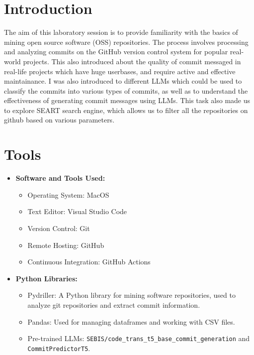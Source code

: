 \documentclass[12pt, a4paper]{report}
\begin{document}
\section{Introduction}

The aim of this laboratory session is to provide familiarity with the basics of mining open source software (OSS) repositories. 
The process involves processing and analyzing commits on the GitHub version control system for popular real-world projects. 
This also introduced about the quality of commit messaged in real-life projects which have huge userbases, and require active and effective maintainance. I was also introduced to different LLMs which could be used to classify the commits into various types of commits, as well as to understand the effectiveness of generating commit messages using LLMs.
This task also made us to explore SEART search engine, which allows us to filter all the repositories on github based on various parameters.

\section{Tools}

\begin{itemize}
    \item \textbf{Software and Tools Used:}
    \begin{itemize}
        \item Operating System: MacOS
        \item Text Editor: Visual Studio Code
        \item Version Control: Git
        \item Remote Hosting: GitHub
        \item Continuous Integration: GitHub Actions
    \end{itemize}

    \item \textbf{Python Libraries:}
    \begin{itemize}
        \item Pydriller: A Python library for mining software repositories, used to analyze git repositories and extract commit information.
        \item Pandas: Used for managing dataframes and working with CSV files.
        \item Pre-trained LLMs: \texttt{SEBIS/code\_trans\_t5\_base\_commit\_generation} and \texttt{CommitPredictorT5}.
    \end{itemize}
\end{itemize}
\end{document}
